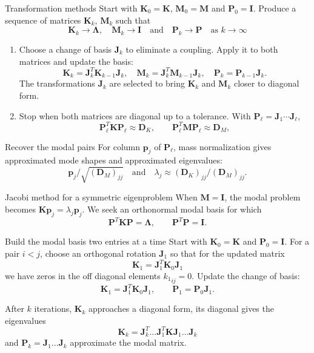 \documentclass[aspectratio=169]{beamer}
\begin{document}
\begin{frame}{Transformation methods}
  \small
  Start with $\mathbf K_0=\mathbf K$, $\mathbf M_0=\mathbf M$ and
  $\mathbf P_0=\mathbf I$. Produce a sequence of matrices $\mathbf K_k$, $\mathbf M_k$ such that
  $$\mathbf K_k\to \mathbf \Lambda,\quad  \mathbf M_k\to \mathbf I  \quad\mbox{and}\quad \mathbf P_k\to \mathbf P\quad\mbox{as } k \to \infty$$
  \vspace{-0.4cm}
  \begin{enumerate}
    \item Choose a change of basis $\mathbf J_k$ to eliminate a coupling.
          Apply it to both matrices and update the basis:
          \[
            \mathbf K_k=\mathbf J_k^T\mathbf K_{k-1}\mathbf J_k,\quad
            \mathbf M_k=\mathbf J_k^T\mathbf M_{k-1}\mathbf J_k,\quad
            \mathbf P_k=\mathbf P_{k-1}\mathbf J_k .
          \]
          The transformations $\mathbf J_k$ are selected to bring $\mathbf K_k$ and $\mathbf M_k$ closer to diagonal form.
    \item Stop when both matrices are diagonal up to a tolerance. With $\mathbf P_\ell=\mathbf J_1\cdots\mathbf J_\ell$,
          \[
            \mathbf P_\ell^T\mathbf K\mathbf P_\ell\approx\mathbf D_K,\qquad
            \mathbf P_\ell^T\mathbf M\mathbf P_\ell\approx\mathbf D_M ,
          \]
  \end{enumerate}
  \vspace{-0.2cm}
  \begin{block}{Recover the modal pairs}
    For column $\mathbf p_j$ of $\mathbf P_\ell$, mass normalization gives approximated mode shapes and approximated eigenvalues:
    \vspace{-0.2cm}
    $$\mathbf p_j/\sqrt{(\mathbf D_M)_{jj}}\quad\mbox{and}\quad \lambda_j\approx(\mathbf D_K)_{jj}/(\mathbf D_M)_{jj}.$$
  \end{block}
\end{frame}

\begin{frame}{Jacobi method for a symmetric eigenproblem}
  \small
  When $\mathbf M=\mathbf I$, the modal problem becomes
  $\mathbf K\mathbf p_j=\lambda_j\mathbf p_j$. We seek an orthonormal modal basis for which
  \[
    \mathbf P^T\mathbf K\mathbf P=\mathbf\Lambda,
    \qquad \mathbf P^T\mathbf P=\mathbf I .
  \]
  \vspace{-0.3cm}
  \begin{block}{\small Build the modal basis two entries at a time}
    Start with $\mathbf K_0=\mathbf K$ and $\mathbf P_0=\mathbf I$.
    For a pair $i<j$, choose an orthogonal rotation $\mathbf J_1$ so that for the updated matrix
    $$\mathbf K_1=\mathbf J_1^T\mathbf K_0\mathbf J_1$$
    we have zeros in the off diagonal elements ${k_1}_{ij}=0$. Update the change of basis:
    \[
      \mathbf K_1=\mathbf J_1^T\mathbf K_{0}\mathbf J_1,
      \qquad \mathbf P_1=\mathbf P_{0}\mathbf J_1 .
    \]
  \end{block}
  After $k$ iterations, $\mathbf K_k$ approaches a diagonal form, its diagonal gives the eigenvalues
  $$\mathbf K_k=\mathbf J_k^T\dots \mathbf J_{1}^T \mathbf K\mathbf J_1\dots\mathbf J_k$$
  and $\mathbf P_k=\mathbf J_1\dots\mathbf J_k$ approximate the modal matrix.
\end{frame}
\end{document}
